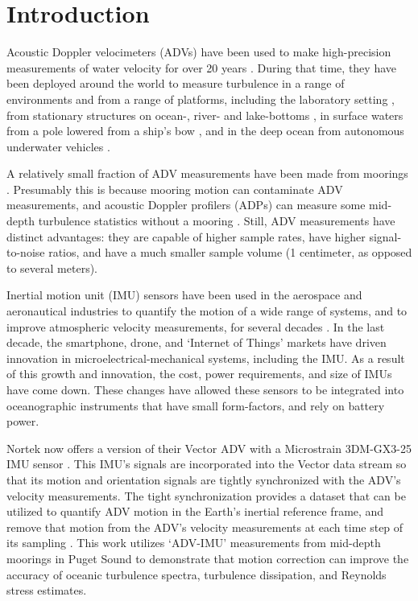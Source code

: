 
\section{Introduction}

Acoustic Doppler velocimeters (ADVs) have been used to make high-precision measurements of water velocity for over 20 years \cite[]{Kraus++1994, Lohrmann++1995}.  During that time, they have been deployed around the world to measure turbulence in a range of environments and from a range of platforms, including the laboratory setting \cite[]{Voulgaris+Trowbridge1998}, from stationary structures on ocean-, river- and lake-bottoms \cite[]{Kim++2000, Lorke2007, Cartwright++2009}, in surface waters from a pole lowered from a ship's bow \cite[]{Geyer++2008}, and in the deep ocean from autonomous underwater vehicles \cite[e.g.,][]{Zhang++2001, Goodman++2006}. 

A relatively small fraction of ADV measurements have been made from moorings \cite[e.g.,][]{Fer+Paskyabi2014}. Presumably this is because mooring motion can contaminate ADV measurements, and acoustic Doppler profilers (ADPs) can measure some mid-depth turbulence statistics without a mooring \cite[e.g.,][]{Stacey++1999a, Rippeth++2002, Wiles++2006, Guerra+Thomson2017}. Still, ADV measurements have distinct advantages: they are capable of higher sample rates, have higher signal-to-noise ratios, and have a much smaller sample volume (1 centimeter, as opposed to several meters). 

Inertial motion unit (IMU) sensors have been used in the aerospace and aeronautical industries to quantify the motion of a wide range of systems, and to improve atmospheric velocity measurements, for several decades \cite[]{Axford1968, Edson++1998, Bevly2004}. In the last decade, the smartphone, drone, and `Internet of Things' markets have driven innovation in microelectrical-mechanical systems, including the IMU. As a result of this growth and innovation, the cost, power requirements, and size of IMUs have come down. These changes have allowed these sensors to be integrated into oceanographic instruments that have small form-factors, and rely on battery power.

Nortek now offers a version of their Vector ADV with a Microstrain 3DM-GX3-25 IMU sensor \cite[]{vector_manual2005, MicroStrain2012a}. This IMU's signals are incorporated into the Vector data stream so that its motion and orientation signals are tightly synchronized with the ADV's velocity measurements. The tight synchronization provides a dataset that can be utilized to quantify ADV motion in the Earth's inertial reference frame, and remove that motion from the ADV's velocity measurements at each time step of its sampling \cite[]{Edson++1998}. This work utilizes `ADV-IMU' measurements from mid-depth moorings in Puget Sound to demonstrate that motion correction can improve the accuracy of oceanic turbulence spectra, turbulence dissipation, and Reynolds stress estimates.

